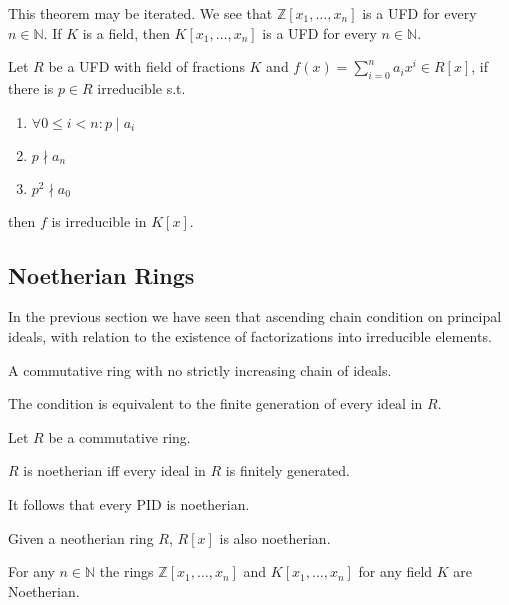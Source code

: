 \begin{remark}
   This theorem may be iterated.
   We see that \(\mathbb{Z}[x_1, \ldots, x_n]\) is a UFD for every \(n \in \mathbb{N}\).
   If \(K\) is a field, then \(K[x_1, \ldots, x_n]\) is a UFD for every \(n \in \mathbb{N}\).
\end{remark}

\begin{proposition}
   Let \(R\) be a UFD with field of fractions \(K\) and \(f(x) = \sum_{i=0}^n a_ix^i \in R[x]\), if there is \(p \in R\) irreducible s.t.
   \begin{enumerate}[label=\roman*, align=Center]
      \item \(\forall 0 \leq i < n: p \mid a_i\)
      \item \(p \nmid a_n\)
      \item \(p^2 \nmid a_0\)
   \end{enumerate}
   then \(f\) is irreducible in \(K[x]\).
\end{proposition}

\subsection{Noetherian Rings}
In the previous section we have seen that ascending chain condition on principal ideals, with relation to the existence of factorizations into irreducible elements.
\begin{definition}
   A commutative ring with no strictly increasing chain of ideals.
\end{definition}
\begin{remark}
   The condition is equivalent to the finite generation of every ideal in \(R\).
\end{remark}

\begin{proposition}
   Let \(R\) be a commutative ring.

   \(R\) is noetherian iff every ideal in \(R\) is finitely generated.
\end{proposition}
\begin{remark}
   It follows that every PID is noetherian.
\end{remark}

\begin{theorem}
   Given a neotherian ring \(R\), \(R[x]\) is also noetherian.
\end{theorem}
\begin{example}
   For any \(n \in \mathbb{N}\) the rings \(\mathbb{Z}[x_1, \ldots, x_n]\) and \(K[x_1, \ldots, x_n]\) for any field \(K\) are Noetherian.
\end{example}

